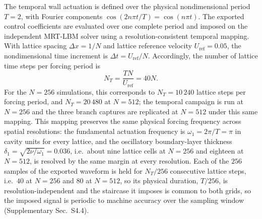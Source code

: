 \documentclass[11pt,a4paper]{article}
\begin{document}
The temporal wall actuation is defined over the physical nondimensional period
$T=2$, with Fourier components $\cos(2n\pi t/T)=\cos(n\pi t)$. The exported
control coefficients are evaluated over one complete period and imposed on the
independent MRT-LBM solver using a resolution-consistent temporal mapping. With
lattice spacing $\Delta x=1/N$ and lattice reference velocity
$U_{\mathrm{ref}}=0.05$, the nondimensional time increment is
$\Delta t=U_{\mathrm{ref}}/N$. Accordingly, the number of lattice time steps per
forcing period is
\begin{equation}
N_T=\frac{TN}{U_{\mathrm{ref}}}=40N .
\label{eq:NT}
\end{equation}
For the $N=256$ simulations, this corresponds to $N_T=10\,240$ lattice steps per
forcing period, and $N_T=20\,480$ at $N=512$; the temporal campaign is run at
$N=256$ and the three branch captures are replicated at $N=512$ under this same
mapping. This mapping preserves the same physical forcing frequency across
spatial resolutions: the fundamental actuation frequency is
$\omega_1=2\pi/T=\pi$ in cavity units for every lattice, and the oscillatory
boundary-layer thickness $\delta_1=\sqrt{2\nu/\omega_1}=0.036$, i.e.\ about nine
lattice cells at $N=256$ and eighteen at $N=512$, is resolved by the same margin
at every resolution. Each
of the $256$ samples of the exported waveform is held for $N_T/256$ consecutive
lattice steps, i.e.\ $40$ at $N=256$ and $80$ at $N=512$, so its physical
duration, $T/256$, is resolution-independent and the staircase it imposes is
common to both grids,
so the imposed signal is periodic to machine accuracy over the
sampling window (Supplementary Sec.~S4.4).
\end{document}
